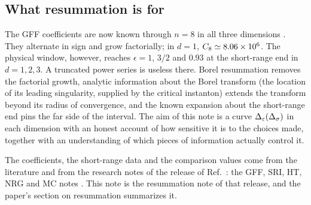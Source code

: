 \subsection{What resummation is for}
The GFF coefficients are now known through $n=8$ in all three dimensions
\cite{rs:noteGFF}. They
alternate in sign and grow factorially; in $d=1$, $C_8\simeq8.06\times10^{6}$. The
physical window, however, reaches $\epsilon=1$, $3/2$ and $0.93$ at the short-range end
in $d=1,2,3$. A truncated power series is useless there. Borel resummation removes the
factorial growth, analytic information about the Borel transform (the location of its
leading singularity, supplied by the critical instanton) extends the transform beyond
its radius of convergence, and the known expansion about the short-range end pins the
far side of the interval. The aim of this note is a curve $\Delta_\varepsilon(\Delta_\sigma)$ in each dimension
with an honest account of how sensitive it is to the choices made, together with an
understanding of which pieces of information actually control it.

The coefficients, the short-range data and the comparison values come from the literature
and from the research notes of the release of Ref.~\cite{rs:LRIpaper}: the GFF, SRI, HT, NRG and
MC notes \cite{rs:noteGFF,rs:noteSRI,rs:noteHT,rs:noteNRG,rs:noteMC}. This note is the resummation note of
that release, and the paper's section on resummation summarizes it.

